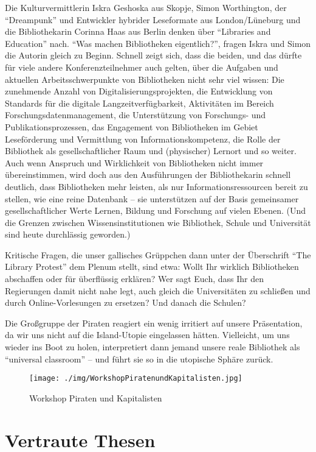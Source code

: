 \documentclass[a4paper,
fontsize=11pt,
oneside,
numbers=noperiodatend,
parskip=half-,
bibliography=totoc,
final
]{scrartcl}
\begin{document}
Die Kulturvermittlerin Iskra Geshoska aus Skopje, Simon Worthington, der
\enquote{Dreampunk} und Entwickler hybrider Leseformate aus
London/Lüneburg und die Bibliothekarin Corinna Haas aus Berlin denken
über \enquote{Libraries and Education} nach. \enquote{Was machen
Bibliotheken eigentlich?}, fragen Iskra und Simon die Autorin gleich zu
Beginn. Schnell zeigt sich, dass die beiden, und das dürfte für viele
andere Konferenzteilnehmer auch gelten, über die Aufgaben und aktuellen
Arbeitsschwerpunkte von Bibliotheken nicht sehr viel wissen: Die
zunehmende Anzahl von Digitalisierungsprojekten, die Entwicklung von
Standards für die digitale Langzeitverfügbarkeit, Aktivitäten im Bereich
Forschungsdatenmanagement, die Unterstützung von Forschungs- und
Publikationsprozessen, das Engagement von Bibliotheken im Gebiet
Leseförderung und Vermittlung von Informationskompetenz, die Rolle der
Bibliothek als gesellschaftlicher Raum und (physischer) Lernort und so
weiter. Auch wenn Anspruch und Wirklichkeit von Bibliotheken nicht immer
übereinstimmen, wird doch aus den Ausführungen der Bibliothekarin
schnell deutlich, dass Bibliotheken mehr leisten, als nur
Informationsressourcen bereit zu stellen, wie eine reine Datenbank --
sie unterstützen auf der Basis gemeinsamer gesellschaftlicher Werte
Lernen, Bildung und Forschung auf vielen Ebenen. (Und die Grenzen
zwischen Wissensinstitutionen wie Bibliothek, Schule und Universität
sind heute durchlässig geworden.)

Kritische Fragen, die unser gallisches Grüppchen dann unter der
Überschrift \enquote{The Library Protest} dem Plenum stellt, sind etwa:
Wollt Ihr wirklich Bibliotheken abschaffen oder für über\-flüssig
erklären? Wer sagt Euch, dass Ihr den Regierungen damit nicht nahe legt,
auch gleich die Universitäten zu schließen und durch Online-Vorlesungen
zu ersetzen? Und danach die Schulen?

Die Großgruppe der Piraten reagiert ein wenig irritiert auf unsere
Präsentation, da wir uns nicht auf die Island-Utopie eingelassen hätten.
Vielleicht, um uns wieder ins Boot zu holen, interpretiert dann jemand
unsere reale Bibliothek als \enquote{universal classroom} -- und führt
sie so in die utopische Sphäre zurück.

\begin{figure}[htbp]
\centering
\texttt{[image: ./img/WorkshopPiratenundKapitalisten.jpg]}
\caption{Workshop Piraten und Kapitalisten}
\end{figure}

\section*{Vertraute Thesen}\label{vertraute-thesen}
\end{document}
